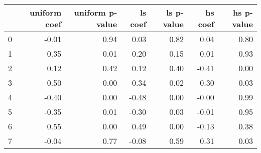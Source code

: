 \begin{tabular}{lrrrrrr}
\toprule
 & uniform coef & uniform p-value & ls coef & ls p-value & hs coef & hs p-value \\
\midrule
0 & -0.01 & 0.94 & 0.03 & 0.82 & 0.04 & 0.80 \\
1 & 0.35 & 0.01 & 0.20 & 0.15 & 0.01 & 0.93 \\
2 & 0.12 & 0.42 & 0.12 & 0.40 & -0.41 & 0.00 \\
3 & 0.50 & 0.00 & 0.34 & 0.02 & 0.30 & 0.03 \\
4 & -0.40 & 0.00 & -0.48 & 0.00 & -0.00 & 0.99 \\
5 & -0.35 & 0.01 & -0.30 & 0.03 & -0.01 & 0.95 \\
6 & 0.55 & 0.00 & 0.49 & 0.00 & -0.13 & 0.38 \\
7 & -0.04 & 0.77 & -0.08 & 0.59 & 0.31 & 0.03 \\
\bottomrule
\end{tabular}
